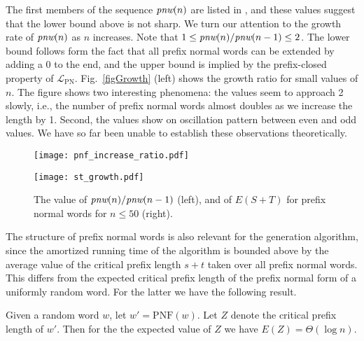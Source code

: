 \documentclass[11pt,a4paper]{llncs}
\newcommand{\PNF}{\mathrm{PNF}}
\newcommand{\LPN}{{\mathcal L}_{\textrm{PN}}}
\begin{document}
The first members of the sequence $\textit{pnw}(n)$ are listed in \cite{sloane2}, and these values suggest that the lower bound above is not sharp. We turn our attention to the growth rate of $\textit{pnw}(n)$ as $n$ increases. Note that $1 \leq \textit{pnw}(n)/\textit{pnw}(n-1) \leq 2$. The lower bound follows form the fact that all prefix normal words can be extended by adding a $0$ to the end, and the upper bound is implied by the prefix-closed property of $\LPN$.  Fig.~\ref{figGrowth} (left) shows the growth ratio for small values of $n$. The figure shows two interesting phenomena: the values seem to approach 2 slowly, i.e., the number of prefix normal words almost doubles as we increase the length by 1. Second, the values show on oscillation pattern between even and odd values. We have so far been unable to establish these observations theoretically.

\begin{figure}
\begin{minipage}[c]{8cm}
\begin{center}
\texttt{[image: pnf\_increase\_ratio.pdf]}
\end{center}
\end{minipage}
\begin{minipage}[c]{8cm}
\begin{center}
\texttt{[image: st\_growth.pdf]}
\end{center}
\end{minipage}
\caption{The value of $\textit{pnw}(n)/\textit{pnw}(n-1)$ (left), and of $E(S+T)$ for prefix normal words for $n \leq 50$ (right).} 
\label{figGrowth}
\label{figSTGrowth}
\end{figure}

The structure of prefix normal words is also relevant for the generation algorithm, since the amortized running time of the algorithm is bounded above by the average value of the critical prefix length $s+t$ taken over all prefix normal words. This differs from the expected critical prefix length of the prefix normal form of a uniformly random word. For the latter we have the following result.

\begin{lemma}\label{lemma:random_pnf_st}
Given a random word $w$, let $w' = \PNF(w)$. Let $Z$ denote the critical prefix length of $w'$. Then for the the expected value of $Z$ we have $E(Z) = \Theta(\log n)$.
\end{lemma}
\end{document}
